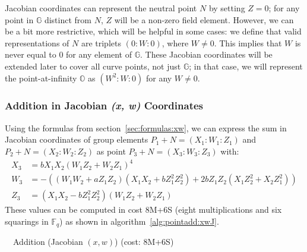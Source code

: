 \documentclass{llncs}
\newcommand{\bF}{\mathbb{F}}
\newcommand{\bG}{\mathbb{G}}
\newcommand{\neutral}{\mathbb{O}}
\begin{document}
Jacobian coordinates can represent the neutral point $N$ by setting $Z =
0$; for any point in $\bG$ distinct from $N$, $Z$ will be a non-zero
field element. However, we can be a bit more restrictive, which will be
helpful in some cases: we define that valid representations of $N$ are
triplets $(0{:}W{:}0)$, where $W\neq 0$. This implies that $W$ is never
equal to $0$ for any element of $\bG$. These Jacobian coordinates will
be extended later to cover all curve points, not just $\bG$; in that
case, we will represent the point-at-infinity $\neutral$ as
$(W^2{:}W{:}0)$ for any $W \neq 0$.

\subsubsection{Addition in Jacobian \emph{(x, w)} Coordinates}

Using the formulas from section~\ref{sec:formulas:xw}, we can
express the sum in Jacobian coordinates of group elements $P_1+N =
(X_1{:}W_1{:}Z_1)$ and $P_2+N = (X_2{:}W_2{:}Z_2)$ as point $P_3+N =
(X_3{:}W_3{:}Z_3)$ with:
\begin{align*}
    X_3 &= b X_1 X_2 (W_1 Z_2 + W_2 Z_1)^4 \\
    W_3 &= -((W_1 W_2 + a Z_1 Z_2)(X_1 X_2 + b Z_1^2 Z_2^2)
        + 2b Z_1 Z_2 (X_1 Z_2^2 + X_2 Z_1^2)) \\
    Z_3 &= (X_1 X_2 -b Z_1^2 Z_2^2)(W_1 Z_2 + W_2 Z_1)
\end{align*}
These values can be computed in cost 8M+6S (eight multiplications and
six squarings in $\bF_q$) as shown in algorithm~\ref{alg:pointadd:xwJ}.

\begin{algorithm}[H]
    \caption{\ \ Addition (Jacobian $(x,w)$) (cost: 8M+6S)}\label{alg:pointadd:xwJ}
    \begin{algorithmic}[1]
    \end{algorithmic}
\end{algorithm}
\end{document}
